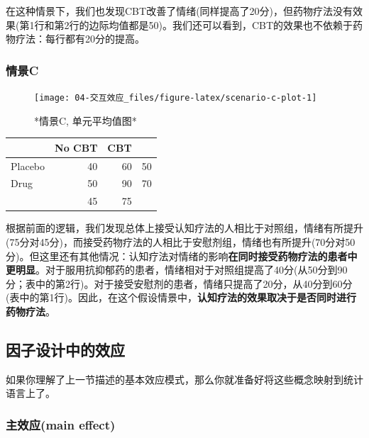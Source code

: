 \documentclass[
]{book}
\begin{document}
在这种情景下，我们也发现CBT改善了情绪(同样提高了20分)，但药物疗法没有效果(第1行和第2行的边际均值都是50)。我们还可以看到，CBT的效果也不依赖于药物疗法：每行都有20分的提高。

\hypertarget{ux60c5ux666fc}{%
\subsubsection*{情景C}\label{ux60c5ux666fc}}

\begin{figure}
\texttt{[image: 04-交互效应\_files/figure-latex/scenario-c-plot-1]} \caption{*情景C, 单元平均值图*}\label{fig:scenario-c-plot}
\end{figure}

\begin{table}
\centering
\begin{tabular}{l|r|r|l}
\hline
  & No CBT & CBT &   \\
\hline
Placebo & 40 & 60 & 50\\
\hline
Drug & 50 & 90 & 70\\
\hline
 & 45 & 75 & \\
\hline
\end{tabular}
\end{table}

根据前面的逻辑，我们发现总体上接受认知疗法的人相比于对照组，情绪有所提升(75分对45分)，而接受药物疗法的人相比于安慰剂组，情绪也有所提升(70分对50分)。但这里还有其他情况：认知疗法对情绪的影响\textbf{在同时接受药物疗法的患者中更明显}。对于服用抗抑郁药的患者，情绪相对于对照组提高了40分(从50分到90分；表中的第2行)。对于接受安慰剂的患者，情绪只提高了20分，从40分到60分(表中的第1行)。因此，在这个假设情景中，\textbf{认知疗法的效果取决于是否同时进行药物疗法}。

\hypertarget{ux56e0ux5b50ux8bbeux8ba1ux4e2dux7684ux6548ux5e94}{%
\subsection{因子设计中的效应}\label{ux56e0ux5b50ux8bbeux8ba1ux4e2dux7684ux6548ux5e94}}

如果你理解了上一节描述的基本效应模式，那么你就准备好将这些概念映射到统计语言上了。

\hypertarget{ux4e3bux6548ux5e94main-effect}{%
\subsubsection{主效应(main effect)}\label{ux4e3bux6548ux5e94main-effect}}
\end{document}
